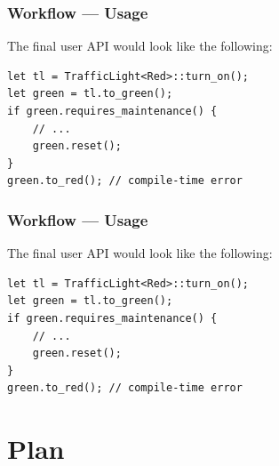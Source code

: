 \documentclass[bigger,notes,aspectratio=169]{beamer}
\begin{document}
\begin{frame}[fragile]
    \frametitle{Workflow --- Usage}
    The final user API would look like the following:
    \begin{listing}
        \centering
        \begin{verbatim}
let tl = TrafficLight<Red>::turn_on();
let green = tl.to_green();
if green.requires_maintenance() {
    // ...
    green.reset();
}
green.to_red(); // compile-time error
        \end{verbatim}
    \end{listing}

\end{frame}

\begin{frame}[fragile]
    \frametitle{Workflow --- Usage}
    The final user API would look like the following:
    \begin{listing}
        \centering
        \begin{verbatim}
let tl = TrafficLight<Red>::turn_on();
let green = tl.to_green();
if green.requires_maintenance() {
    // ...
    green.reset();
}
green.to_red(); // compile-time error
        \end{verbatim}
    \end{listing}

\end{frame}

\section{Plan}
\end{document}

